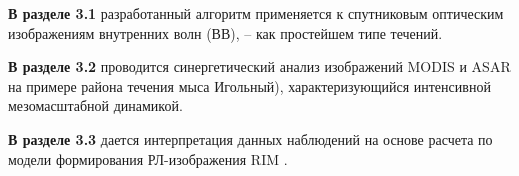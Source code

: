 \textbf{В разделе 3.1} разработанный алгоритм применяется к спутниковым оптическим изображениям внутренних волн (ВВ), -- как простейшем типе течений. 

\textbf{В разделе 3.2} проводится синергетический анализ изображений MODIS и ASAR на примере района течения мыса Игольный), характеризующийся интенсивной мезомасштабной динамикой.

\textbf{В разделе 3.3} дается интерпретация данных наблюдений на основе расчета по модели формирования РЛ-изображения RIM \citep{Kudryavtsev2005,Johannessen2005}.


\clearpage